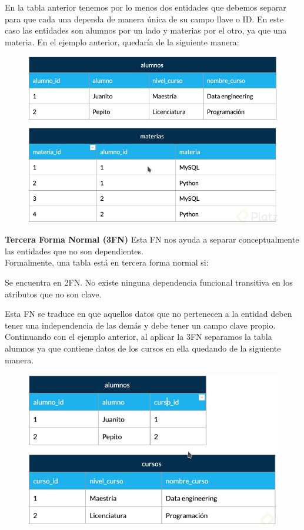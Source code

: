\documentclass{article}
\begin{document}
En la tabla anterior tenemos por lo menos dos entidades que debemos separar
para que cada una dependa de manera única de su campo llave o ID. En este caso
las entidades son alumnos por un lado y materias por el otro, ya que una
materia. En el ejemplo anterior, quedaría de la siguiente manera:

\begin{figure}[h!]
    \centering
      \includegraphics[scale=0.5]{./Pictures/030_normalizacion.png}
\end{figure}

\textbf{Tercera Forma Normal (3FN)}
Esta FN nos ayuda a separar conceptualmente las entidades que no son
dependientes.\\

Formalmente, una tabla está en tercera forma normal si:

Se encuentra en 2FN. No existe ninguna dependencia funcional transitiva en los
atributos que no son clave.

Esta FN se traduce en que aquellos datos que no pertenecen a la entidad deben
tener una independencia de las demás y debe tener un campo clave propio.
Continuando con el ejemplo anterior, al aplicar la 3FN separamos la tabla
alumnos ya que contiene datos de los cursos en ella quedando de la siguiente
manera.

\begin{figure}[h!]
    \centering
      \includegraphics[scale=0.5]{./Pictures/031_normalizacion.png}
\end{figure}
\end{document}
